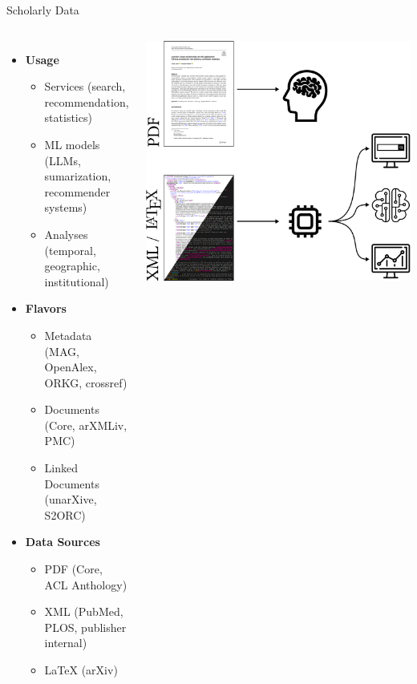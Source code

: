 \documentclass[en,16:9,smallfoot]{sdqbeamer}
\begin{document}
   \begin{frame}{Scholarly Data}
   \begin{columns}
        \begin{itemize}
            \item \textbf{Usage}
            \begin{itemize}
                \item Services {\color{contextgrey}(search, recommendation, statistics)}
                \item ML models {\color{contextgrey}(LLMs, sumarization, recommender systems)} %
                \item Analyses {\color{contextgrey}(temporal, geographic, institutional)}
            \end{itemize}
            \item \textbf{Flavors}
            \begin{itemize}
                \item Metadata {\color{contextgrey}(MAG, OpenAlex, ORKG, crossref)}
                \item Documents {\color{contextgrey}(Core, arXMLiv, PMC)}
                \item Linked Documents {\color{contextgrey}(unarXive, S2ORC)}
            \end{itemize}
            \item \textbf{Data Sources}
            \begin{itemize}
                \item PDF {\color{contextgrey}(Core, ACL Anthology)}
                \item XML {\color{contextgrey}(PubMed, PLOS, publisher internal)}
                \item LaTeX {\color{contextgrey}(arXiv)}
            \end{itemize}
        \end{itemize}
            \includegraphics[width=\linewidth]{imgs/scholarly_data_background}
   \end{columns}
   \end{frame}
\end{document}
